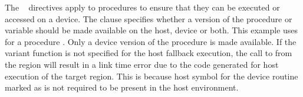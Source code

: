 

The ~ directives apply to procedures to ensure that they can be executed or accessed on a device. 
The  clause specifies whether a version of the procedure or variable should be made available on the host, device or both. 
This example uses   for a procedure . Only a device version of the procedure  is made available. 
If the variant function  is not specified for the host fallback execution, the call to  from the  region will result in a link time error due to the code generated for host execution of the target region.
This is because host symbol for the device routine  marked as  is not required to be present in the host environment.


